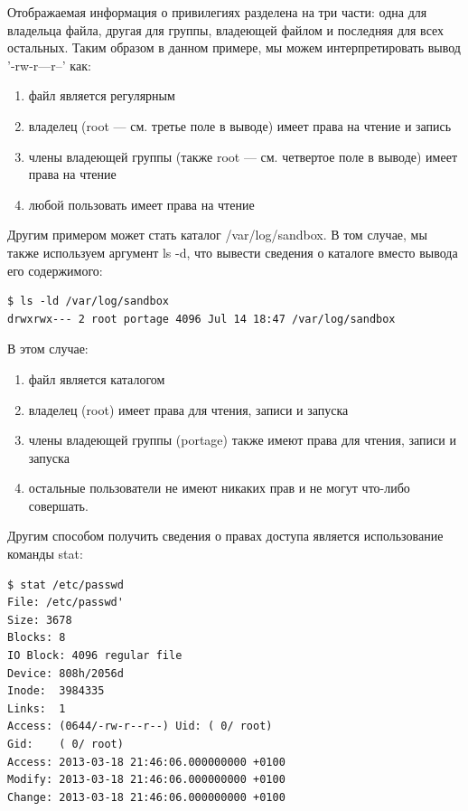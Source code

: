 \documentclass[10pt]{book}
\begin{document}
Отображаемая информация о привилегиях разделена на три части: одна для владельца файла, другая для группы, владеющей файлом и последняя для всех остальных. Таким образом в данном примере, мы можем интерпретировать вывод '-rw-r—r--' как: 

\begin{enumerate}
\item файл является регулярным
\item владелец (root — см. третье поле в выводе) имеет права на чтение и запись
\item члены владеющей группы (также root — см. четвертое поле в выводе) имеет права на чтение 
\item любой пользовать имеет права на чтение                                           
\end{enumerate}

Другим примером может стать каталог /var/log/sandbox. В том случае, мы также используем аргумент ls -d, что вывести сведения о каталоге вместо вывода его содержимого:

\vspace{3mm}
\begin{tcolorbox}
\begin{lstlisting}
$ ls -ld /var/log/sandbox
drwxrwx--- 2 root portage 4096 Jul 14 18:47 /var/log/sandbox
\end{lstlisting}
\end{tcolorbox}

В этом случае:

\begin{enumerate}
\item файл является каталогом
\item владелец (root) имеет права для чтения, записи и запуска 
\item члены владеющей группы (portage) также имеют права для чтения, записи и запуска 
\item остальные пользователи не имеют никаких прав и не могут что-либо совершать.
\end{enumerate}

Другим способом получить сведения о правах доступа является использование команды stat: 

\vspace{3mm}
\begin{tcolorbox}
\begin{lstlisting}
$ stat /etc/passwd
File: /etc/passwd'
Size: 3678 
Blocks: 8 
IO Block: 4096 regular file 
Device:	808h/2056d 
Inode:	3984335 
Links:	1 
Access:	(0644/-rw-r--r--) Uid: ( 0/ root) 
Gid:	( 0/ root)
Access:	2013-03-18 21:46:06.000000000 +0100
Modify:	2013-03-18 21:46:06.000000000 +0100
Change:	2013-03-18 21:46:06.000000000 +0100
\end{lstlisting}
\end{tcolorbox}
\end{document}

